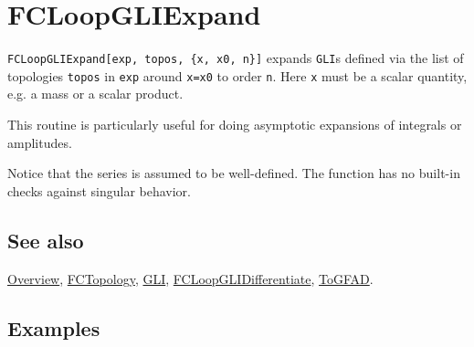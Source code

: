 \documentclass[../FeynCalcManual.tex]{subfiles}
\begin{document}
\hypertarget{fcloopgliexpand}{%
\section{FCLoopGLIExpand}\label{fcloopgliexpand}}

\texttt{FCLoopGLIExpand[\allowbreak{}exp,\ \allowbreak{}topos,\ \allowbreak{}\{\allowbreak{}x,\ \allowbreak{}x0,\ \allowbreak{}n\}]}
expands \texttt{GLI}s defined via the list of topologies \texttt{topos}
in \texttt{exp} around \texttt{x=x0} to order \texttt{n}. Here
\texttt{x} must be a scalar quantity, e.g. a mass or a scalar product.

This routine is particularly useful for doing asymptotic expansions of
integrals or amplitudes.

Notice that the series is assumed to be well-defined. The function has
no built-in checks against singular behavior.

\subsection{See also}

\hyperlink{toc}{Overview}, \hyperlink{fctopology}{FCTopology},
\hyperlink{gli}{GLI},
\hyperlink{fcloopglidifferentiate}{FCLoopGLIDifferentiate},
\hyperlink{togfad}{ToGFAD}.

\subsection{Examples}

\begin{Shaded}
\begin{Highlighting}[]
\OperatorTok{[}\OperatorTok{[}\OperatorTok{,} \OperatorTok{\{}\OperatorTok{,} \OperatorTok{,} \OperatorTok{\}],} 
  \OperatorTok{\{}\OperatorTok{[}\OperatorTok{,} \OperatorTok{\{}\OperatorTok{[\{}\OperatorTok{,}\OperatorTok{\}],}\OperatorTok{[\{}\OperatorTok{,}\OperatorTok{\}],}\OperatorTok{[\{}\SpecialCharTok{{-}}\OperatorTok{,}\OperatorTok{\}]\},} 
    \OperatorTok{\{}\OperatorTok{,}\OperatorTok{\},} \OperatorTok{\{\},} \OperatorTok{\{\},} \OperatorTok{\{\}]\},} \OperatorTok{\{}\OperatorTok{,} \OperatorTok{,} \OperatorTok{\}]}
\end{Highlighting}
\end{Shaded}
\end{document}
